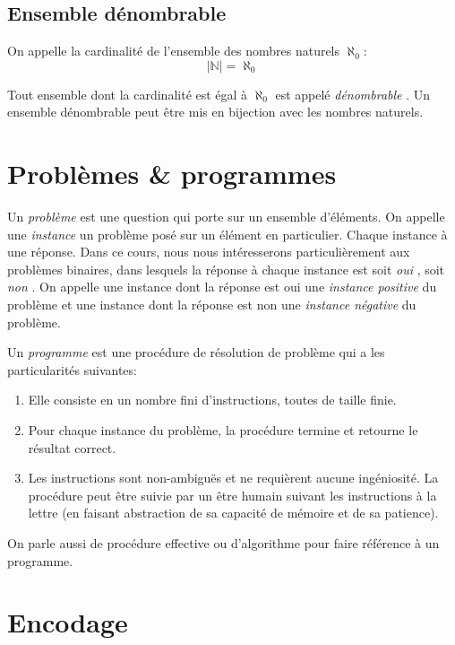 \subsection{Ensemble dénombrable}

On appelle la cardinalité de l'ensemble des nombres naturels $\aleph_0$:
\[
|\mathbb{N}| = \aleph_0
\]

Tout ensemble dont la cardinalité est égal à $\aleph_0$ est appelé \og \textit{dénombrable} \fg{}.
Un ensemble dénombrable peut être mis en bijection avec les nombres naturels.

\section{Problèmes \& programmes}

Un \og \textit{problème} \fg{} est une question qui porte sur un ensemble d'éléments.
On appelle une \og \textit{instance} \fg{} un problème posé sur un élément en particulier.
Chaque instance à une réponse.
Dans ce cours, nous nous intéresserons particulièrement aux problèmes binaires, dans lesquels la réponse à chaque instance est soit \og \textit{oui} \fg{}, soit \og \textit{non} \fg{}.
On appelle une instance dont la réponse est \og oui \fg{} une \og \textit{instance positive} \fg{} du problème et une instance dont la réponse est \og non \fg{} une \og \textit{instance négative} \fg{} du problème.

Un \og \textit{programme} \fg{} est une procédure de résolution de problème qui a les particularités suivantes:
\begin{enumerate}
\item
Elle consiste en un nombre fini d'instructions, toutes de taille finie.
\item
Pour chaque instance du problème, la procédure termine et retourne le résultat correct.
\item
Les instructions sont non-ambiguës et ne requièrent aucune ingéniosité. La procédure peut être suivie par un être humain suivant les instructions à la lettre (en faisant abstraction de sa capacité de mémoire et de sa patience). 
\end{enumerate}
On parle aussi de \og procédure effective \fg{} ou d'\og algorithme \fg{} pour faire référence à un programme.

\section{Encodage}

